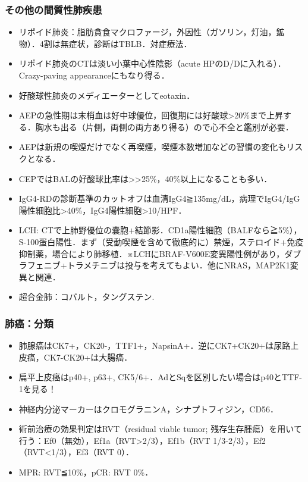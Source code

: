 \subsubsection{その他の間質性肺疾患}

\begin{itemize}
\item リポイド肺炎：脂肪貪食マクロファージ，外因性（ガソリン，灯油，鉱物）．4割は無症状，診断はTBLB．対症療法．
\item リポイド肺炎のCTは淡い小葉中心性陰影（acute HPのD/Dに入れる）．Crazy-paving appearanceにもなり得る．
\item 好酸球性肺炎のメディエーターとしてeotaxin．
\item AEPの急性期は末梢血は好中球優位，回復期には好酸球>20\%まで上昇する．胸水も出る（片側，両側の両方あり得る）ので心不全と鑑別が必要．
\item AEPは新規の喫煙だけでなく再喫煙，喫煙本数増加などの習慣の変化もリスクとなる．
\item CEPではBALの好酸球比率は>>25\%，40\%以上になることも多い．
\item IgG4-RDの診断基準のカットオフは血清IgG4≧135mg/dL，病理でIgG4/IgG陽性細胞比>40\%，IgG4陽性細胞>10/HPF．
\item LCH: CTで上肺野優位の嚢胞+結節影．CD1a陽性細胞（BALFなら≧5\%），S-100蛋白陽性．まず（受動喫煙を含めて徹底的に）禁煙，ステロイド+免疫抑制薬，場合により肺移植．※LCHにBRAF-V600E変異陽性例があり，ダブラフェニブ+トラメチニブは投与を考えてもよい．他にNRAS，MAP2K1変異と関連．
\item 超合金肺：コバルト，タングステン.
\end{itemize}


\subsubsection{肺癌：分類}

\begin{itemize}
\item 肺腺癌はCK7+，CK20-，TTF1+，NapsinA+．逆にCK7+CK20+は尿路上皮癌，CK7-CK20+は大腸癌．
\item 扁平上皮癌はp40+, p63+, CK5/6+．AdとSqを区別したい場合はp40とTTF-1を見る！
\item 神経内分泌マーカーはクロモグラニンA，シナプトフィジン，CD56．
\item 術前治療の効果判定はRVT（residual viable tumor; 残存生存腫瘍）を用いて行う：Ef0（無効），Ef1a（RVT>2/3），Ef1b（RVT 1/3-2/3），Ef2（RVT<1/3），Ef3（RVT 0）．
\item MPR: RVT≦10\%，pCR: RVT 0\%．


\end{itemize}


